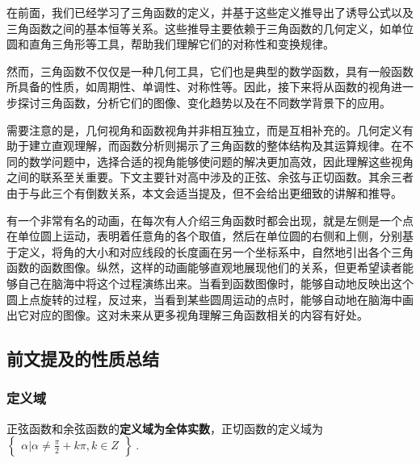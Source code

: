 
\begin{issues}
\issueDraft
\end{issues}


在前面，我们已经学习了三角函数的定义，并基于这些定义推导出了诱导公式以及三角函数之间的基本恒等关系。这些推导主要依赖于三角函数的几何定义，如单位圆和直角三角形等工具，帮助我们理解它们的对称性和变换规律。

然而，三角函数不仅仅是一种几何工具，它们也是典型的数学函数，具有一般函数所具备的性质，如周期性、单调性、对称性等。因此，接下来将从函数的视角进一步探讨三角函数，分析它们的图像、变化趋势以及在不同数学背景下的应用。

需要注意的是，几何视角和函数视角并非相互独立，而是互相补充的。几何定义有助于建立直观理解，而函数分析则揭示了三角函数的整体结构及其运算规律。在不同的数学问题中，选择合适的视角能够使问题的解决更加高效，因此理解这些视角之间的联系至关重要。下文主要针对高中涉及的正弦、余弦与正切函数。其余三者由于与此三个有倒数关系，本文会适当提及，但不会给出更细致的讲解和推导。

有一个非常有名的动画，在每次有人介绍三角函数时都会出现，就是左侧是一个点在单位圆上运动，表明着任意角的各个取值，然后在单位圆的右侧和上侧，分别基于定义，将角的大小和对应线段的长度画在另一个坐标系中，自然地引出各个三角函数的函数图像。纵然，这样的动画能够直观地展现他们的关系，但更希望读者能够自己在脑海中将这个过程演练出来。当看到函数图像时，能够自动地反映出这个圆上点旋转的过程，反过来，当看到某些圆周运动的点时，能够自动地在脑海中画出它对应的图像。这对未来从更多视角理解三角函数相关的内容有好处。

\subsection{前文提及的性质总结}

\subsubsection{定义域}

正弦函数和余弦函数的\textbf{定义域为全体实数}，正切函数的定义域为 $\begin{Bmatrix}\alpha|\alpha \neq \frac{\pi}{2}+k\pi,k\in Z\end{Bmatrix}~.$

